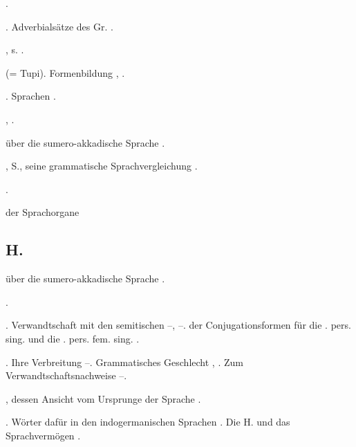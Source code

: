 \begin{register}
 \pageref{sp.232}.

. Adverbialsätze des Gr. \pageref{sp.104}.

, s. .

 (= Tupi). Formenbildung \pageref{sp.328}, \pageref{sp.423}.

. Sprachen \pageref{sp.150}.

 \pageref{sp.36}, \sed{\pageref{sp.148},} \pageref{sp.197}.

 über die sumero-akkadische Sprache \pageref{sp.389}.

, S., seine grammatische Sprachvergleichung \pageref{sp.26}.

 \pageref{sp.157}.

 der Sprachorgane 

\subsection*{H.}\label{reg.H}


 über die sumero-akkadische Sprache \pageref{sp.389}.

 \pageref{sp.246}.

 \pageref{sp.142}. Verwandtschaft mit den semitischen \pageref{sp.160}–\pageref{sp.162}, \pageref{sp.281}–\pageref{sp.282}.   der Conjugationsformen für die \pageref{sp.2}. pers. sing. und die \pageref{sp.3}. pers. fem. sing. \pageref{sp.307}.

. Ihre Verbreitung \pageref{sp.142}–\pageref{sp.143}. Grammatisches Geschlecht \pageref{sp.160}, \pageref{sp.254}. Zum Verwandtschaftsnachweise \pageref{sp.160}–\pageref{sp.162}.

, dessen Ansicht vom Ursprunge der Sprache \pageref{sp.19}.

. Wörter dafür in den indogermanischen Sprachen \pageref{sp.153}. Die H. und das Sprachvermögen \pageref{sp.305}.


\end{register}
